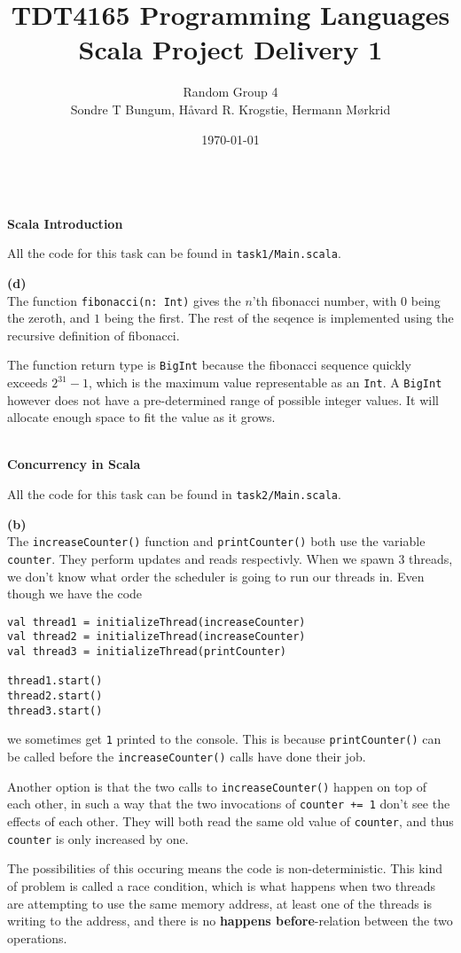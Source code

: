 \documentclass[12pt]{article}
\title{TDT4165 Programming Languages\\Scala Project Delivery 1}
\author{\small{Random Group 4}\\ \small{Sondre T Bungum, Håvard R. Krogstie, Hermann Mørkrid}}
\date{\today}
\newcommand{\task}[1]{\vspace*{5mm}\hspace*{-2cm}\fbox{#1}\\[-5mm]}
\newcommand{\subtask}[1]{\hspace*{-1cm}\textbf{(#1)}\\[-5mm]}
\begin{document}
\maketitle

\task{1}
\textbf{Scala Introduction}

All the code for this task can be found in \verb|task1/Main.scala|.

\subtask{d}
The function \verb|fibonacci(n: Int)| gives the $n$'th fibonacci number,
with $0$ being the zeroth, and $1$ being the first. The rest of the seqence
is implemented using the recursive definition of fibonacci.

The function return type is \verb|BigInt| because the fibonacci sequence
quickly exceeds $2^{31}-1$, which is the maximum value representable as an \verb|Int|.
A \verb|BigInt| however does not have a pre-determined range of possible integer values.
It will allocate enough space to fit the value as it grows.

\task{2}
\textbf{Concurrency in Scala}

All the code for this task can be found in \verb|task2/Main.scala|.

\subtask{b}
The \verb|increaseCounter()| function and \verb|printCounter()| both use the variable \verb|counter|.
They perform updates and reads respectivly. When we spawn 3 threads, we don't know what order
the scheduler is going to run our threads in. Even though we have the code
%
\begin{verbatim}
val thread1 = initializeThread(increaseCounter)
val thread2 = initializeThread(increaseCounter)
val thread3 = initializeThread(printCounter)

thread1.start()
thread2.start()
thread3.start()
\end{verbatim}
%
we sometimes get \verb|1| printed to the console. This is because \verb|printCounter()|
can be called before the \verb|increaseCounter()| calls have done their job.

Another option is that the two calls to \verb|increaseCounter()| happen on top of each other,
in such a way that the two invocations of \verb|counter += 1| don't see the effects of each other.
They will both read the same old value of \verb|counter|, and thus \verb|counter| is only increased by one.

The possibilities of this occuring means the code is non-deterministic.
This kind of problem is called a race condition, which is what happens when
two threads are attempting to use the same memory address,
at least one of the threads is writing to the address,
and there is no \textbf{happens before}-relation between the two operations.
\end{document}
